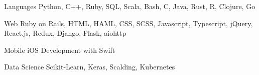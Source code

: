 


\begin{cvskills}


  \cvskill
  {Languages}
  {Python, C++, Ruby, SQL, Scala, Bash, C, Java, Rust, R, Clojure, Go}


  \cvskill
  {Web}
  {Ruby on Rails, HTML, HAML, CSS, SCSS, Javascript, Typescript, jQuery, React.js, Redux, Django, Flask, aiohttp}


  \cvskill
  {Mobile}
  {iOS Development with Swift}


  \cvskill
  {Data Science}
  {Scikit-Learn, Keras, Scalding, Kubernetes}

\end{cvskills}
